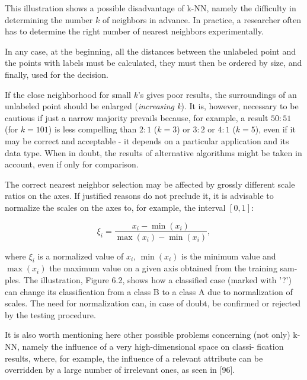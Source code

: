 \documentclass[11pt,openany,executivepaper]{book}
\begin{document}
This illustration shows a possible disadvantage of k-NN, namely the difficulty 
in determining the number $k$ of neighbors in advance. In practice, a researcher 
often has to determine the right number of nearest neighbors experimentally.

In any case, at the beginning, all the distances between the unlabeled point 
and the points with labels must be calculated, they must then be ordered by size, 
and finally, used for the decision.

If the close neighborhood for small $k$'s gives poor results, the surroundings 
of an unlabeled point should be enlarged (\textit{increasing k}). It is, however, necessary 
to be cautious if just a narrow majority prevails because, for example, a result 
$50:51$ (for $k=101$) is less compelling than $2:1$ ($k=3$) or $3:2$ or $4:1$ ($k=5$), even if 
it may be correct and acceptable - it depends on a particular application and its 
data type. When in doubt, the results of alternative algorithms might be taken in 
account, even if only for comparison.



The correct nearest neighbor selection may be affected by grossly different 
scale ratios on the axes. If justified reasons do not preclude it, it is advisable to 
normalize the scales on the axes to, for example, the interval $[0, 1]$:

\begin{equation*}
    \xi_i = \frac{x_i - \min(x_i)}{\max(x_i) - \min(x_i)},
\end{equation*}

where $\xi_i$ is a normalized value of $x_i$, $\min(x_i)$ is the minimum value and 
$\max(x_i)$ the maximum value on a given axis obtained from the training sam-
ples. The illustration, Figure 6.2, shows how a classified case (marked with '?') 
can change its classification from a class B to a class A due to normalization of 
scales. The need for normalization can, in case of doubt, be confirmed or rejected 
by the testing procedure.

It is also worth mentioning here other possible problems concerning (not 
only) k-NN, namely the influence of a very high-dimensional space on classi-
fication results, where, for example, the influence of a relevant attribute can be 
overridden by a large number of irrelevant ones, as seen in [96].
\end{document}
